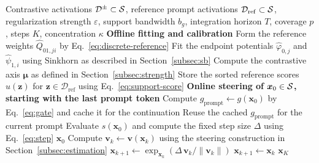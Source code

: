 \begin{algorithm}[t]
\caption{\Cobras}
\label{alg:cobras}
\small
\begin{algorithmic}[1]
\Require Contrastive activations $\mathcal{D}^\pm\subset\mathcal{S}$, reference prompt activations $\mathcal{D}_{\mathrm{ref}}\subset\mathcal{S}$,
regularization strength $\varepsilon$, support bandwidth $b_g$,
integration horizon $T$, coverage $p$, steps $K$, concentration $\kappa$
\Statex \textbf{Offline fitting and calibration}
\State Form the reference weights $\widehat{Q}_{01,ji}$ by Eq.~\eqref{eq:discrete-reference}
\State Fit the endpoint potentials $\widehat{\varphi}_{0,j}$ and $\widehat{\psi}_{1,i}$ using Sinkhorn as described in Section~\ref{subsec:sb}
\State Compute the contrastive axis $\boldsymbol{\mu}$ as defined in Section~\ref{subsec:strength}
\State Store the sorted reference scores $u(\boldsymbol{z})$ for $\boldsymbol{z}\in\mathcal{D}_{\mathrm{ref}}$ using Eq.~\eqref{eq:support-score}
\Statex \textbf{Online steering of $\boldsymbol{x}_0\in\mathcal{S}$, starting with the last prompt token}
    \State Compute $g_{\mathrm{prompt}}\gets g(\boldsymbol{x}_0)$ by Eq.~\eqref{eq:gate} and cache it for the continuation
\Else
    \State Reuse the cached $g_{\mathrm{prompt}}$ for the current prompt
\EndIf
\State Evaluate $s(\boldsymbol{x}_0)$ and compute the fixed step size $\Delta$ using Eq.~\eqref{eq:step}
    \State \Return $\boldsymbol{x}_0$
\EndIf
{}
    \State Compute $\boldsymbol{v}_k\gets\boldsymbol{v}(\boldsymbol{x}_k)$ using the steering construction in Section~\ref{subsec:estimation}
        \State $\boldsymbol{x}_{k+1}\gets
        \exp_{\boldsymbol{x}_k}(\Delta\,\boldsymbol{v}_k/\|\boldsymbol{v}_k\|)$
    \Else
        \State $\boldsymbol{x}_{k+1}\gets\boldsymbol{x}_k$
    \EndIf
\EndFor
\State \Return $\boldsymbol{x}_K$
\end{algorithmic}
\end{algorithm}

